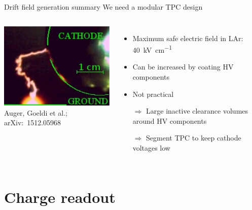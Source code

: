 \documentclass[]{beamer}
\newcommand*{\emphcol}{red}
\newcommand*{\emphcoltitle}{blue}
\newcommand*{\lar}{{LAr}}
\begin{document}
\begin{frame}{Drift field generation summary}{\color{\emphcoltitle} We need a modular TPC design}
	\begin{columns}[c]
		\centering
		\includegraphics[width=\textwidth]{hv/sidespark}\\
		{\tiny Auger, Goeldi et al.; arXiv:~1512.05968~\cite{breakdown_16}}
		\begin{itemize}
			\item Maximum safe electric field in \lar{}: \SI{40}{\kilo\volt\per\centi\metre}
			\item Can be increased by coating HV components
			\item Not practical
			\item[$\Rightarrow$] Large inactive clearance volumes around HV components
			\item[$\Rightarrow$] {\color{\emphcol} Segment TPC to keep cathode voltages low}
		\end{itemize}
	\end{columns}
\end{frame}

\section{Charge readout}
\end{document}

